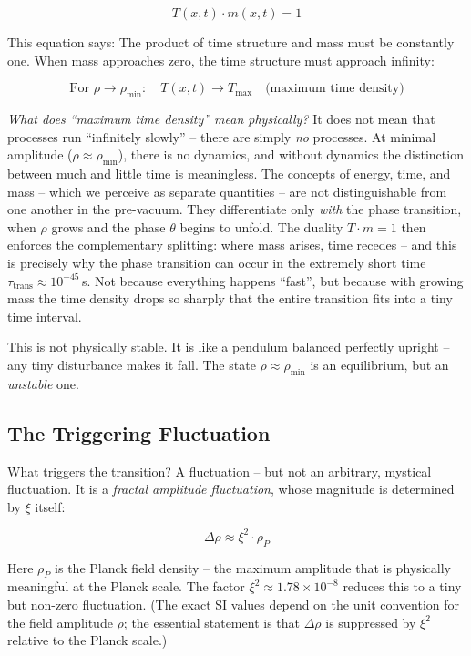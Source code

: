 	\begin{equation}
		T(x,t) \cdot m(x,t) = 1
	\end{equation}
	
	This equation says: The product of time structure and mass must be constantly one. When mass approaches zero, the time structure must approach infinity:
	
	\begin{equation}
		\text{For } \rho \to \rho_{\min}: \quad T(x,t) \to T_{\max} \quad \text{(maximum time density)}
	\end{equation}
	
	\textit{What does ``maximum time density'' mean physically?} It does not mean that processes run ``infinitely slowly'' -- there are simply \textit{no} processes. At minimal amplitude ($\rho \approx \rho_{\min}$), there is no dynamics, and without dynamics the distinction between much and little time is meaningless. The concepts of energy, time, and mass -- which we perceive as separate quantities -- are not distinguishable from one another in the pre-vacuum. They differentiate only \textit{with} the phase transition, when $\rho$ grows and the phase $\theta$ begins to unfold. The duality $T \cdot m = 1$ then enforces the complementary splitting: where mass arises, time recedes -- and this is precisely why the phase transition can occur in the extremely short time $\tau_{\text{trans}} \approx 10^{-45}\,$s. Not because everything happens ``fast'', but because with growing mass the time density drops so sharply that the entire transition fits into a tiny time interval.
	
	This is not physically stable. It is like a pendulum balanced perfectly upright -- any tiny disturbance makes it fall. The state $\rho \approx \rho_{\min}$ is an equilibrium, but an \textit{unstable} one.
	
	\subsection{The Triggering Fluctuation}
	
	What triggers the transition? A fluctuation -- but not an arbitrary, mystical fluctuation. It is a \textit{fractal amplitude fluctuation}, whose magnitude is determined by $\xi$ itself:
	
	\begin{equation}
		\Delta\rho \approx \xi^2 \cdot \rho_P
	\end{equation}
	
	Here $\rho_P$ is the Planck field density -- the maximum amplitude that is physically meaningful at the Planck scale. The factor $\xi^2 \approx 1.78 \times 10^{-8}$ reduces this to a tiny but non-zero fluctuation. (The exact SI values depend on the unit convention for the field amplitude $\rho$; the essential statement is that $\Delta\rho$ is suppressed by $\xi^2$ relative to the Planck scale.)
	
